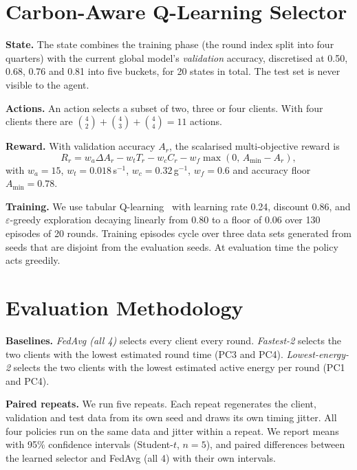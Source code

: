 \documentclass[conference]{IEEEtran}
\begin{document}
\section{Carbon-Aware Q-Learning Selector}\label{sec:rl}

\textbf{State.} The state combines the training phase (the round index split into four quarters) with the current global model's \emph{validation} accuracy, discretised at 0.50, 0.68, 0.76 and 0.81 into five buckets, for 20 states in total. The test set is never visible to the agent.

\textbf{Actions.} An action selects a subset of two, three or four clients. With four clients there are $\binom{4}{2}+\binom{4}{3}+\binom{4}{4}=11$ actions.

\textbf{Reward.} With validation accuracy $A_r$, the scalarised multi-objective reward is
\begin{equation}
R_r = w_a \Delta A_r - w_t T_r - w_c C_r - w_f \max(0,\, A_{\min} - A_r),
\end{equation}
with $w_a{=}15$, $w_t{=}0.018$\,s$^{-1}$, $w_c{=}0.32$\,g$^{-1}$, $w_f{=}0.6$ and accuracy floor $A_{\min}{=}0.78$.

\textbf{Training.} We use tabular Q-learning~\cite{watkins1992qlearning} with learning rate 0.24, discount 0.86, and $\varepsilon$-greedy exploration decaying linearly from 0.80 to a floor of 0.06 over 130 episodes of 20 rounds. Training episodes cycle over three data sets generated from seeds that are disjoint from the evaluation seeds. At evaluation time the policy acts greedily.

\section{Evaluation Methodology}\label{sec:method}

\textbf{Baselines.} \emph{FedAvg (all 4)} selects every client every round. \emph{Fastest-2} selects the two clients with the lowest estimated round time (PC3 and PC4). \emph{Lowest-energy-2} selects the two clients with the lowest estimated active energy per round (PC1 and PC4).

\textbf{Paired repeats.} We run five repeats. Each repeat regenerates the client, validation and test data from its own seed and draws its own timing jitter. All four policies run on the same data and jitter within a repeat. We report means with 95\% confidence intervals (Student-$t$, $n{=}5$), and paired differences between the learned selector and FedAvg (all 4) with their own intervals.
\end{document}

